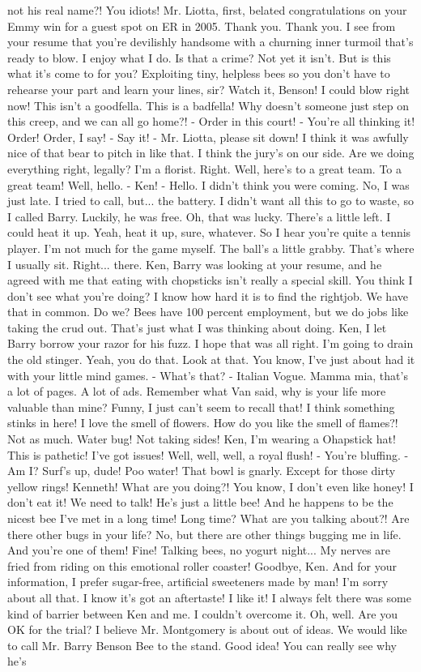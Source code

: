 \documentclass{article}
\begin{document}
not his real name?! You idiots! Mr. Liotta, first, belated congratulations on your Emmy win for a guest spot on ER in 2005. Thank you. Thank you. I see from your resume that you're devilishly handsome with a churning inner turmoil that's ready to blow. I enjoy what I do. Is that a crime? Not yet it isn't. But is this what it's come to for you? Exploiting tiny, helpless bees so you don't have to rehearse your part and learn your lines, sir? Watch it, Benson! I could blow right now! This isn't a goodfella. This is a badfella! Why doesn't someone just step on this creep, and we can all go home?! - Order in this court! - You're all thinking it! Order! Order, I say! - Say it! - Mr. Liotta, please sit down! I think it was awfully nice of that bear to pitch in like that. I think the jury's on our side. Are we doing everything right, legally? I'm a florist. Right. Well, here's to a great team. To a great team! Well, hello. - Ken! - Hello. I didn't think you were coming. No, I was just late. I tried to call, but... the battery. I didn't want all this to go to waste, so I called Barry. Luckily, he was free. Oh, that was lucky. There's a little left. I could heat it up. Yeah, heat it up, sure, whatever. So I hear you're quite a tennis player. I'm not much for the game myself. The ball's a little grabby. That's where I usually sit. Right... there. Ken, Barry was looking at your resume, and he agreed with me that eating with chopsticks isn't really a special skill. You think I don't see what you're doing? I know how hard it is to find the rightjob. We have that in common. Do we? Bees have 100 percent employment, but we do jobs like taking the crud out. That's just what I was thinking about doing. Ken, I let Barry borrow your razor for his fuzz. I hope that was all right. I'm going to drain the old stinger. Yeah, you do that. Look at that. You know, I've just about had it with your little mind games. - What's that? - Italian Vogue. Mamma mia, that's a lot of pages. A lot of ads. Remember what Van said, why is your life more valuable than mine? Funny, I just can't seem to recall that! I think something stinks in here! I love the smell of flowers. How do you like the smell of flames?! Not as much. Water bug! Not taking sides! Ken, I'm wearing a Ohapstick hat! This is pathetic! I've got issues! Well, well, well, a royal flush! - You're bluffing. - Am I? Surf's up, dude! Poo water! That bowl is gnarly. Except for those dirty yellow rings! Kenneth! What are you doing?! You know, I don't even like honey! I don't eat it! We need to talk! He's just a little bee! And he happens to be the nicest bee I've met in a long time! Long time? What are you talking about?! Are there other bugs in your life? No, but there are other things bugging me in life. And you're one of them! Fine! Talking bees, no yogurt night... My nerves are fried from riding on this emotional roller coaster! Goodbye, Ken. And for your information, I prefer sugar-free, artificial sweeteners made by man! I'm sorry about all that. I know it's got an aftertaste! I like it! I always felt there was some kind of barrier between Ken and me. I couldn't overcome it. Oh, well. Are you OK for the trial? I believe Mr. Montgomery is about out of ideas. We would like to call Mr. Barry Benson Bee to the stand. Good idea! You can really see why he's 
\end{document}
